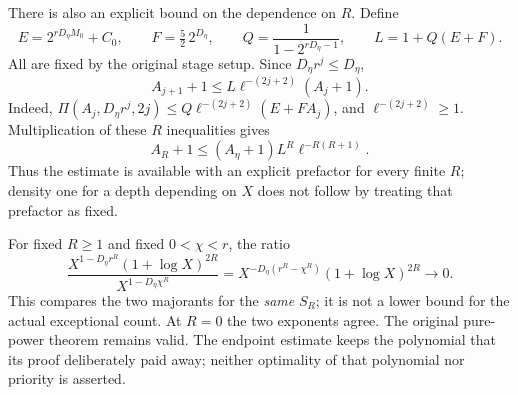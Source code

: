 \documentclass[11pt]{article}
\theoremstyle{remark}\newtheorem{remark}[proposition]{Remark}
\begin{document}
There is also an explicit bound on the dependence on \(R\).
Define
\[
 E=2^{rD_\eta M_0}+C_0,\qquad F=\tfrac52\,2^{D_\eta},
 \qquad Q=\frac1{1-2^{rD_\eta-1}},\qquad L=1+Q(E+F).
\]
All are fixed by the original stage setup. Since \(D_\eta r^j\le D_\eta\),
\[
 A_{j+1}+1\le L\ell^{-(2j+2)}(A_j+1).
\]
Indeed, \(\Pi(A_j,D_\eta r^j,2j)\le
Q\ell^{-(2j+2)}(E+FA_j)\), and \(\ell^{-(2j+2)}\ge1\).
Multiplication of these \(R\) inequalities gives
\begin{equation}\label{eq:shaik-log-prefactor}
 A_R+1\le(A_\eta+1)L^R\ell^{-R(R+1)} .
\end{equation}
Thus the estimate is available with an explicit prefactor for every
finite \(R\); density one for a depth depending on \(X\) does not follow
by treating that prefactor as fixed.

For fixed \(R\ge1\) and fixed \(0<\chi<r\), the ratio
\[
 \frac{X^{1-D_\eta r^R}(1+\log X)^{2R}}
      {X^{1-D_\eta\chi^R}}
 =X^{-D_\eta(r^R-\chi^R)}(1+\log X)^{2R}
 \longrightarrow0 .
\]
This compares the two majorants for the \emph{same} \(S_R\);
it is not a lower bound for the actual exceptional count.
At \(R=0\) the two exponents agree.
The original pure-power theorem remains valid. The endpoint estimate
keeps the polynomial that its proof deliberately paid away; neither
optimality of that polynomial nor priority is asserted.
\end{document}
